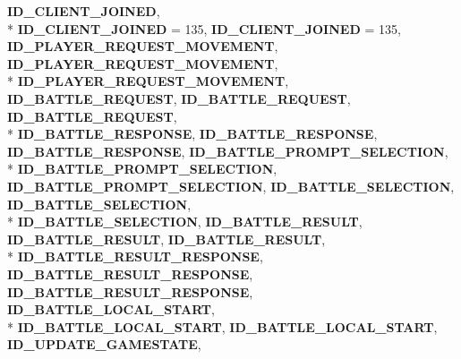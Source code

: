 \begin{DoxyCompactItemize}
{\bfseries I\-D\-\_\-\-C\-L\-I\-E\-N\-T\-\_\-\-J\-O\-I\-N\-E\-D}, 
\\*
{\bfseries I\-D\-\_\-\-C\-L\-I\-E\-N\-T\-\_\-\-J\-O\-I\-N\-E\-D} = 135, 
{\bfseries I\-D\-\_\-\-C\-L\-I\-E\-N\-T\-\_\-\-J\-O\-I\-N\-E\-D} = 135, 
{\bfseries I\-D\-\_\-\-P\-L\-A\-Y\-E\-R\-\_\-\-R\-E\-Q\-U\-E\-S\-T\-\_\-\-M\-O\-V\-E\-M\-E\-N\-T}, 
{\bfseries I\-D\-\_\-\-P\-L\-A\-Y\-E\-R\-\_\-\-R\-E\-Q\-U\-E\-S\-T\-\_\-\-M\-O\-V\-E\-M\-E\-N\-T}, 
\\*
{\bfseries I\-D\-\_\-\-P\-L\-A\-Y\-E\-R\-\_\-\-R\-E\-Q\-U\-E\-S\-T\-\_\-\-M\-O\-V\-E\-M\-E\-N\-T}, 
{\bfseries I\-D\-\_\-\-B\-A\-T\-T\-L\-E\-\_\-\-R\-E\-Q\-U\-E\-S\-T}, 
{\bfseries I\-D\-\_\-\-B\-A\-T\-T\-L\-E\-\_\-\-R\-E\-Q\-U\-E\-S\-T}, 
{\bfseries I\-D\-\_\-\-B\-A\-T\-T\-L\-E\-\_\-\-R\-E\-Q\-U\-E\-S\-T}, 
\\*
{\bfseries I\-D\-\_\-\-B\-A\-T\-T\-L\-E\-\_\-\-R\-E\-S\-P\-O\-N\-S\-E}, 
{\bfseries I\-D\-\_\-\-B\-A\-T\-T\-L\-E\-\_\-\-R\-E\-S\-P\-O\-N\-S\-E}, 
{\bfseries I\-D\-\_\-\-B\-A\-T\-T\-L\-E\-\_\-\-R\-E\-S\-P\-O\-N\-S\-E}, 
{\bfseries I\-D\-\_\-\-B\-A\-T\-T\-L\-E\-\_\-\-P\-R\-O\-M\-P\-T\-\_\-\-S\-E\-L\-E\-C\-T\-I\-O\-N}, 
\\*
{\bfseries I\-D\-\_\-\-B\-A\-T\-T\-L\-E\-\_\-\-P\-R\-O\-M\-P\-T\-\_\-\-S\-E\-L\-E\-C\-T\-I\-O\-N}, 
{\bfseries I\-D\-\_\-\-B\-A\-T\-T\-L\-E\-\_\-\-P\-R\-O\-M\-P\-T\-\_\-\-S\-E\-L\-E\-C\-T\-I\-O\-N}, 
{\bfseries I\-D\-\_\-\-B\-A\-T\-T\-L\-E\-\_\-\-S\-E\-L\-E\-C\-T\-I\-O\-N}, 
{\bfseries I\-D\-\_\-\-B\-A\-T\-T\-L\-E\-\_\-\-S\-E\-L\-E\-C\-T\-I\-O\-N}, 
\\*
{\bfseries I\-D\-\_\-\-B\-A\-T\-T\-L\-E\-\_\-\-S\-E\-L\-E\-C\-T\-I\-O\-N}, 
{\bfseries I\-D\-\_\-\-B\-A\-T\-T\-L\-E\-\_\-\-R\-E\-S\-U\-L\-T}, 
{\bfseries I\-D\-\_\-\-B\-A\-T\-T\-L\-E\-\_\-\-R\-E\-S\-U\-L\-T}, 
{\bfseries I\-D\-\_\-\-B\-A\-T\-T\-L\-E\-\_\-\-R\-E\-S\-U\-L\-T}, 
\\*
{\bfseries I\-D\-\_\-\-B\-A\-T\-T\-L\-E\-\_\-\-R\-E\-S\-U\-L\-T\-\_\-\-R\-E\-S\-P\-O\-N\-S\-E}, 
{\bfseries I\-D\-\_\-\-B\-A\-T\-T\-L\-E\-\_\-\-R\-E\-S\-U\-L\-T\-\_\-\-R\-E\-S\-P\-O\-N\-S\-E}, 
{\bfseries I\-D\-\_\-\-B\-A\-T\-T\-L\-E\-\_\-\-R\-E\-S\-U\-L\-T\-\_\-\-R\-E\-S\-P\-O\-N\-S\-E}, 
{\bfseries I\-D\-\_\-\-B\-A\-T\-T\-L\-E\-\_\-\-L\-O\-C\-A\-L\-\_\-\-S\-T\-A\-R\-T}, 
\\*
{\bfseries I\-D\-\_\-\-B\-A\-T\-T\-L\-E\-\_\-\-L\-O\-C\-A\-L\-\_\-\-S\-T\-A\-R\-T}, 
{\bfseries I\-D\-\_\-\-B\-A\-T\-T\-L\-E\-\_\-\-L\-O\-C\-A\-L\-\_\-\-S\-T\-A\-R\-T}, 
{\bfseries I\-D\-\_\-\-U\-P\-D\-A\-T\-E\-\_\-\-G\-A\-M\-E\-S\-T\-A\-T\-E}, 

\end{DoxyCompactItemize}
